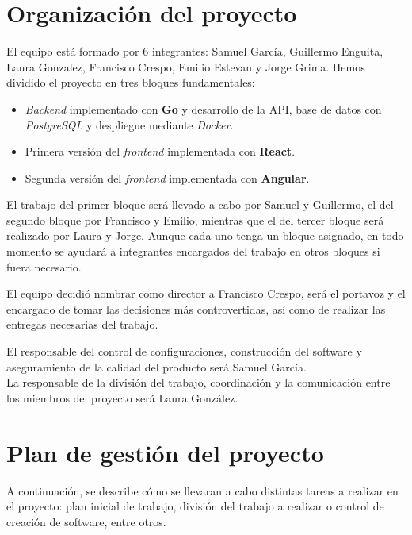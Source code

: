 \documentclass[11pt, a4paper, titlepage]{article}
\begin{document}
\section{Organización del proyecto}
El equipo está formado por 6 integrantes: Samuel García, Guillermo Enguita, Laura Gonzalez, Francisco Crespo, Emilio Estevan y Jorge Grima.
Hemos dividido el proyecto en tres bloques fundamentales:\newline
\begin{itemize}
    \item \textit{Backend} implementado con \textbf{Go} y desarrollo de la API, base de datos con \textit{PostgreSQL} y despliegue mediante \textit{Docker}.
    \item Primera versión del \textit{frontend} implementada con \textbf{React}.
    \item Segunda versión del \textit{frontend} implementada con \textbf{Angular}.\newline
\end{itemize}

El trabajo del primer bloque será llevado a cabo por Samuel y Guillermo, el del segundo bloque por Francisco y Emilio, mientras que el del tercer bloque será realizado por Laura y Jorge.
Aunque cada uno tenga un bloque asignado, en todo momento se ayudará a integrantes encargados del trabajo en otros bloques si fuera necesario. \newline

El equipo decidió nombrar como director a Francisco Crespo, será el portavoz y el encargado de tomar las decisiones más controvertidas, así como de realizar las entregas necesarias del trabajo.\newline

El responsable del control de configuraciones, construcción del software y aseguramiento de la calidad del producto será Samuel García.\\

La responsable de la división del trabajo, coordinación y la comunicación entre los miembros del proyecto será Laura González.

\section{Plan de gestión del proyecto}

A continuación, se describe cómo se llevaran a cabo distintas tareas a realizar en el proyecto: plan inicial de trabajo, división del trabajo a realizar o control de creación de software, entre otros.
\end{document}
